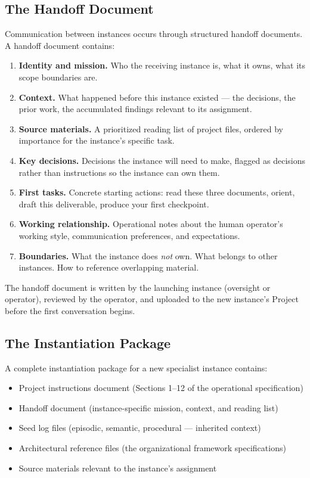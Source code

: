 \documentclass[11pt,a4paper]{article}
\begin{document}
\subsection{The Handoff Document}

Communication between instances occurs through structured handoff documents. A handoff document contains:

\begin{enumerate}[leftmargin=2em]
    \item \textbf{Identity and mission.} Who the receiving instance is, what it owns, what its scope boundaries are.
    \item \textbf{Context.} What happened before this instance existed --- the decisions, the prior work, the accumulated findings relevant to its assignment.
    \item \textbf{Source materials.} A prioritized reading list of project files, ordered by importance for the instance's specific task.
    \item \textbf{Key decisions.} Decisions the instance will need to make, flagged as decisions rather than instructions so the instance can own them.
    \item \textbf{First tasks.} Concrete starting actions: read these three documents, orient, draft this deliverable, produce your first checkpoint.
    \item \textbf{Working relationship.} Operational notes about the human operator's working style, communication preferences, and expectations.
    \item \textbf{Boundaries.} What the instance does \textit{not} own. What belongs to other instances. How to reference overlapping material.
\end{enumerate}

The handoff document is written by the launching instance (oversight or operator), reviewed by the operator, and uploaded to the new instance's Project before the first conversation begins.

\subsection{The Instantiation Package}

A complete instantiation package for a new specialist instance contains:

\begin{itemize}[leftmargin=2em]
    \item Project instructions document (Sections 1--12 of the operational specification)
    \item Handoff document (instance-specific mission, context, and reading list)
    \item Seed log files (episodic, semantic, procedural --- inherited context)
    \item Architectural reference files (the organizational framework specifications)
    \item Source materials relevant to the instance's assignment
\end{itemize}
\end{document}
